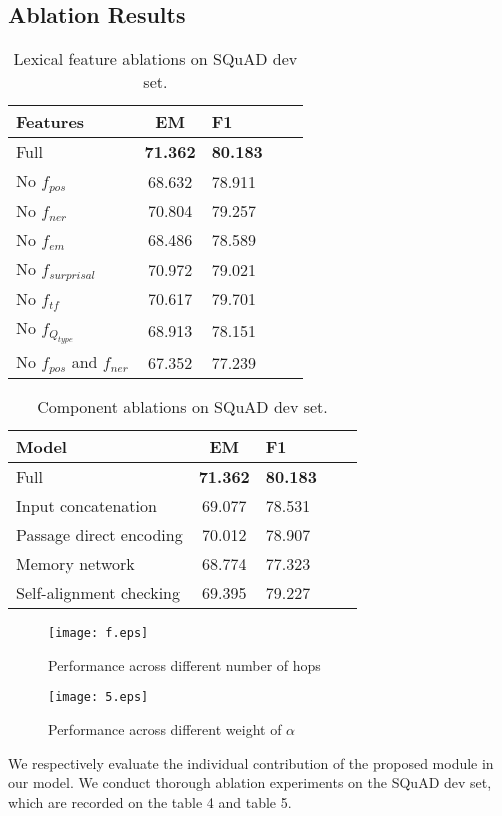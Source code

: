 \documentclass[letterpaper]{article} %
\begin{document}
\subsection{Ablation Results}
\begin{table}[!t]
	\centering
	\begin{tabular}{lclcl}
		\toprule
		Features & EM &F1 \\
		\midrule
		Full & \textbf{71.362}        &\textbf{80.183}  \\
		\midrule
		No $f_{pos}$ &68.632      &78.911  \\
		No $f_{ner}$ &70.804        &79.257\\
		No $f_{em}$ &68.486       &78.589\\
		No $f_{surprisal}$ &70.972&79.021\\
		No $f_{tf}$ &70.617           &79.701\\
		No $f_{Q_{type}}$ &68.913&78.151\\
		No $f_{pos}$ and $ f_{ner}$ &67.352&77.239\\
		\bottomrule	
	\end{tabular}
	\caption{Lexical feature ablations on SQuAD dev set.}
\end{table}
\begin{table}[!t]
	\centering
	\begin{tabular}{lclcl}
		\toprule
		Model & EM &F1 \\
		\midrule
		Full & \textbf{71.362}        &\textbf{80.183}  \\
		\midrule
		Input concatenation &69.077  &78.531  \\
		Passage direct encoding &70.012&78.907 \\
		Memory network &68.774&77.323\\
		Self-alignment checking&69.395& 79.227 \\
		\bottomrule	
	\end{tabular}
	\caption{Component ablations on SQuAD dev set.}
\end{table}
\begin{figure}[t]
	\centering
	\texttt{[image: f.eps]}
	\caption{Performance across different number of hops}
\end{figure}
\begin{figure}[t]
	\centering
	\texttt{[image: 5.eps]}
	\caption{Performance across different weight of $\alpha$}
\end{figure}
We respectively evaluate the individual contribution of the proposed module in our model. We conduct thorough ablation experiments on the SQuAD dev set, which are recorded on the table 4 and table 5. 
\end{document}
